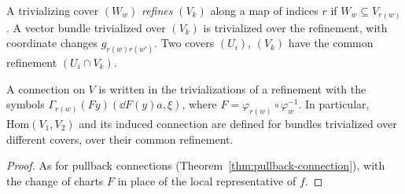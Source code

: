 \begin{definition}[Refinements]
  \label{def:cover-refinement}
  \leanok
  A trivializing cover $(W_w)$ \emph{refines} $(V_k)$ along a map of indices $r$ if
  $W_w \subseteq V_{r(w)}$. A vector bundle trivialized over $(V_k)$ is trivialized over the
  refinement, with coordinate changes $g_{r(w) r(w')}$. Two covers $(U_i)$, $(V_k)$ have the
  common refinement $(U_i \cap V_k)$.
\end{definition}

\begin{theorem}
  \label{thm:refine-connection}
  \leanok
  A connection on $V$ is written in the trivializations of a refinement with the symbols
  $\Gamma_{r(w)}(F y)(\dd F(y) a, \xi)$, where $F = \varphi_{r(w)} \circ \varphi_w^{-1}$. In
  particular, $\mathrm{Hom}(V_1, V_2)$ and its induced connection are defined for bundles
  trivialized over different covers, over their common refinement.
\end{theorem}

\begin{proof}
  \leanok
  As for pullback connections (Theorem~\ref{thm:pullback-connection}), with the change of charts
  $F$ in place of the local representative of $f$.
\end{proof}
